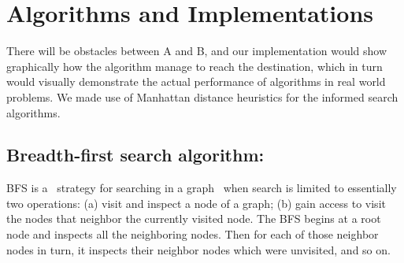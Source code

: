 \documentclass[a4paper]{article}
\begin{document}
 

\section{Algorithms and Implementations}

There will be obstacles between A and B, and our implementation would show graphically how the algorithm manage to reach the destination, which in turn would visually demonstrate the actual performance of algorithms in real world problems. We made use of Manhattan distance heuristics for the informed search algorithms.


\subsection{Breadth-first search algorithm:}

BFS is a  strategy for searching in a graph  when search is limited to essentially two operations: (a) visit and inspect a node of a graph; (b) gain access to visit the nodes that neighbor the currently visited node. The BFS begins at a root node and inspects all the neighboring nodes. Then for each of those neighbor nodes in turn, it inspects their neighbor nodes which were unvisited, and so on.
\end{document}

